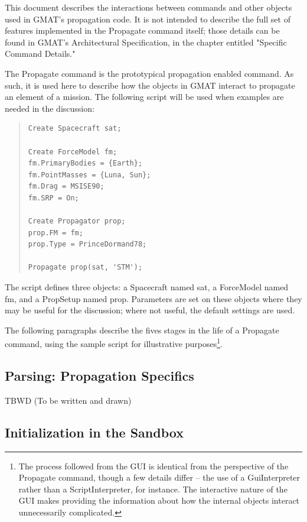 \documentclass[10pt]{article}
\begin{document}
This document describes the interactions between commands and other objects used in GMAT's
propagation code.  It is not intended to describe the full set of features implemented in the
Propagate command itself; those details can be found in GMAT's Architectural
Specification\cite{GMAT:2008}, in the chapter entitled "Specific Command Details."

The Propagate command is the prototypical propagation enabled command.  As such, it is used here to
describe how the objects in GMAT interact to propagate an element of a mission.  The following
script will be used when examples are needed in the discussion:

\begin{quote}
\begin{verbatim}
Create Spacecraft sat;

Create ForceModel fm;
fm.PrimaryBodies = {Earth};
fm.PointMasses = {Luna, Sun};
fm.Drag = MSISE90;
fm.SRP = On;

Create Propagator prop;
prop.FM = fm;
prop.Type = PrinceDormand78;

Propagate prop(sat, 'STM');
\end{verbatim}
\end{quote}

\noindent The script defines three objects: a Spacecraft named sat, a ForceModel named fm, and a
PropSetup named prop.  Parameters are set on these objects where they may be useful for the
discussion; where not useful, the default settings are used.

The following paragraphs describe the fives stages in the life of a Propagate command, using the
sample script for illustrative purposes\footnote{The process followed from the GUI is identical from
the perspective of the Propagate command, though a few details differ -- the use of a GuiInterpreter
rather than a ScriptInterpreter, for instance.  The interactive nature of the GUI makes providing
the information about how the internal objects interact unnecessarily complicated.}.

\subsection{Parsing: Propagation Specifics}

TBWD  (To be written and drawn)

\subsection{Initialization in the Sandbox}
\end{document}
